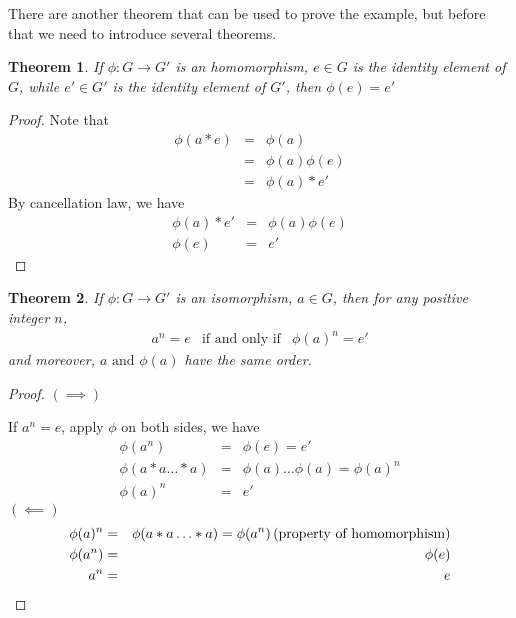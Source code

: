 \documentclass{article}
\theoremstyle{MyNonumberplain}
\theoremstyle{break}
\newtheorem*{proof}{Proof. }
\newcommand{\p}{\phi}
\newcommand{\infixand}{\text{ and }}
\newcommand{\tmop}{\text}
\theoremstyle{break}
\newtheorem{theorem}{Theorem}[section]
\theoremstyle{break}
\theoremstyle{definition}
\theoremstyle{break}
\begin{document}
There are another theorem that can be used to prove the example, but before that we need to introduce several theorems. 

\begin{thmbox}
    \begin{theorem}
        If $\p : G \rightarrow G'$ is an homomorphism, $e \in G$ is the identity
        element of $G$, while $e' \in G'$ is the identity element of $G'$, then $\p
        (e) = e'$
    \end{theorem}
    \begin{prfbox}
        \begin{proof}
            Note that
            \begin{eqnarray*}
            \p (a \ast e) & = & \p (a)\\
            & = & \p (a) \p (e)\\
            & = & \p (a) \ast e'
            \end{eqnarray*}
            By cancellation law, we have
            \begin{eqnarray*}
            \p (a) \ast e' & = & \p (a) \p (e)\\
            \p (e) & = & e'
            \end{eqnarray*}
        \end{proof}
    \end{prfbox}
\end{thmbox}

\begin{thmbox}
    \begin{theorem}
        If $\p : G \rightarrow G'$ is an isomorphism, $a \in G$, then for any
        positive integer $n$,
        \begin{eqnarray*}
        a^n = e & \tmop{if and only if} & \p (a)^n = e'
        \end{eqnarray*}
        and moreover, $a \infixand \p (a)$ have the same order.
    \end{theorem}
    \begin{prfbox}
        \begin{proof}
                $(\implies)$
              
              If $a^n = e$, apply $\p$ on both sides, we have
              \begin{eqnarray*}
                \p (a^n) & = & \p (e) = e'\\
                \p (a \ast a \ldots \ast a) & = & \p (a) \ldots \p (a) = \p (a)^n\\
                \p (a)^n & = & e'
              \end{eqnarray*}
$(\impliedby)$
              \begin{eqnarray*}
                \p (a)^n & = & \p (a \ast a \ldots \ast a) = \p (a^n) \hspace*{\fill} \left(
                \text{property of homomorphism} \right)\\
                \p (a^n) & = & \p (e)\\
                a^n & = & e
              \end{eqnarray*}
        \end{proof}
    \end{prfbox}
\end{thmbox}
\end{document}
